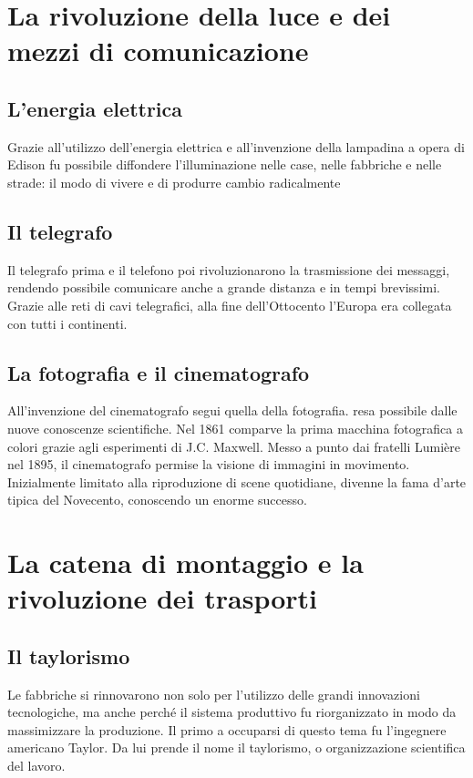 \documentclass{report}
\begin{document}
\section{La rivoluzione della luce e dei mezzi di comunicazione}
\subsection{L'energia elettrica}
Grazie all'utilizzo dell'energia elettrica e all'invenzione della lampadina a opera di Edison fu possibile diffondere l'illuminazione nelle case, nelle fabbriche e nelle strade: il modo di vivere e di produrre cambio radicalmente

\subsection{Il telegrafo}
Il telegrafo prima e il telefono poi rivoluzionarono la trasmissione dei messaggi, rendendo possibile comunicare anche a grande distanza e in tempi brevissimi. Grazie alle reti di cavi telegrafici, alla fine dell'Ottocento l'Europa era collegata con tutti i continenti.

\subsection{La fotografia e il cinematografo}
All'invenzione del cinematografo segui quella della fotografia. resa possibile dalle nuove conoscenze scientifiche. Nel 1861 comparve la prima macchina fotografica a colori grazie agli esperimenti di J.C. Maxwell. Messo a punto dai fratelli Lumière nel 1895, il cinematografo permise la visione di immagini in movimento. Inizialmente limitato alla riproduzione di scene quotidiane, divenne la fama d'arte tipica del Novecento, conoscendo un enorme successo.

\section{La catena di montaggio e la rivoluzione dei trasporti}
\subsection{Il taylorismo}
Le fabbriche si rinnovarono non solo per l'utilizzo delle grandi innovazioni tecnologiche, ma anche perché il sistema produttivo fu riorganizzato in modo da massimizzare la produzione. Il primo a occuparsi di questo tema fu l'ingegnere americano Taylor. Da lui prende il nome il taylorismo, o organizzazione scientifica del lavoro.
\end{document}
